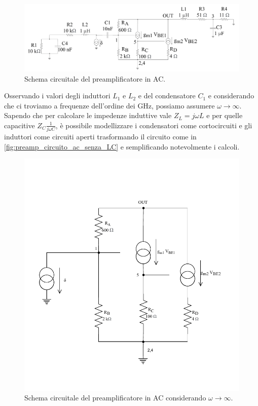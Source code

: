 \begin{figure}[h!]
    \centering
    \includegraphics[width=1\linewidth]{img/preamp_circuito_ac.pdf}
    \caption{Schema circuitale del preamplificatore in AC.}
    \label{fig:preamp_circuito_ac}
\end{figure}

Osservando i valori degli induttori $L_1$ e $L_2$ e del condensatore $C_1$ e considerando che ci troviamo a frequenze dell'ordine dei 
\si{\giga\hertz}, possiamo assumere $\omega\to \infty$. Sapendo che per calcolare le impedenze induttive vale $Z_L=j \omega L$ e per quelle
capacitive $Z_C\frac{1}{j \omega C}$, è possibile modellizzare i condensatori come cortocircuiti e gli induttori come circuiti aperti trasformando il 
circuito come in \autoref*{fig:preamp_circuito_ac_senza_LC} e semplificando notevolmente i calcoli.
\begin{figure}[h!]
    \centering
    \includegraphics[width=1\linewidth]{img/preamp_circuito_ac_senza_LC.pdf}
    \caption{Schema circuitale del preamplificatore in AC considerando $\omega\to \infty$.}
    \label{fig:preamp_circuito_ac_senza_LC}
\end{figure}

